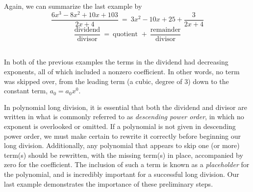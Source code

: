 \newpage
Again, we can summarize the last example by
$$\frac{6 x^3 - 8 x^2 + 10 x + 103}{2x+4}~=~3 x^2 - 10 x + 25 + \frac{3}{2 x + 4}$$ 
$$\frac{\text{dividend}}{\text{divisor}}~=~\text{quotient~}+~\frac{\text{remainder}}{\text{divisor}}$$
~\pp

In both of the previous examples the terms in the dividend had decreasing exponents, all of which included a nonzero coefficient.  In other words, no term was skipped over, from the leading term (a cubic, degree of 3) down to the constant term, $a_0=a_0x^0$.\pp

In polynomial long division, it is essential that both the dividend and divisor are written in what is commonly referred to as \textit{descending power order}, in which no exponent is overlooked or omitted. If a polynomial is not given in descending power order, we must make certain to rewrite it correctly before beginning our long division.\pp
Additionally, any polynomial that appears to skip one (or more) term(s) should be rewritten, with the missing term(s) in place, accompanied by zero for the coefficient. The inclusion of such a term is known as a \textit{placeholder} for the polynomial, and is incredibly important for a successful long division.\pp
Our last example demonstrates the importance of these preliminary steps.
